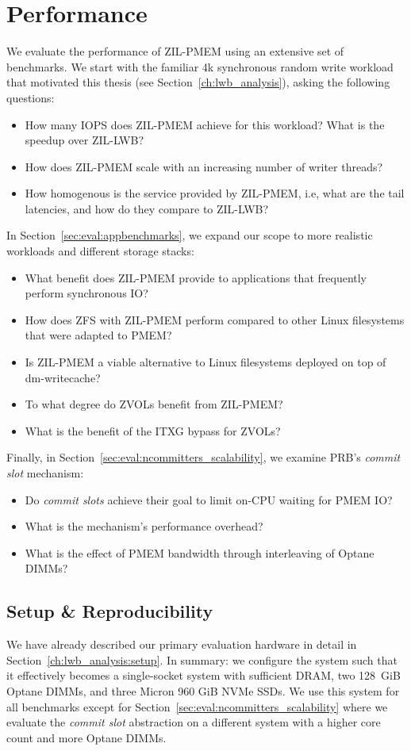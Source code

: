\documentclass[12pt,a4paper,twoside]{book}
\begin{document}
{\clearpage

\section{Performance}

We evaluate the performance of ZIL-PMEM using an extensive set of benchmarks.
We start with the familiar 4k synchronous random write workload that motivated this thesis (see Section~\ref{ch:lwb_analysis}), asking the following questions:
\begin{itemize}[noitemsep]
    \item How many IOPS does ZIL-PMEM achieve for this workload? What is the speedup over ZIL-LWB?
    \item How does ZIL-PMEM scale with an increasing number of writer threads?
    \item How homogenous is the service provided by ZIL-PMEM, i.e, what are the tail latencies, and how do they compare to ZIL-LWB?
\end{itemize}
In Section~\ref{sec:eval:appbenchmarks}, we expand our scope to more realistic workloads and different storage stacks:
\begin{itemize}[noitemsep]
    \item What benefit does ZIL-PMEM provide to applications that frequently perform synchronous IO?
    \item How does ZFS with ZIL-PMEM perform compared to other Linux filesystems that were adapted to PMEM?
    \item Is ZIL-PMEM a viable alternative to Linux filesystems deployed on top of dm-writecache?
    \item To what degree do ZVOLs benefit from ZIL-PMEM?
    \item What is the benefit of the ITXG bypass for ZVOLs?
\end{itemize}
Finally, in Section~\ref{sec:eval:ncommitters_scalability}, we examine PRB's \textit{commit slot} mechanism:
\begin{itemize}[noitemsep]
    \item Do \textit{commit slots} achieve their goal to limit on-CPU waiting for PMEM IO?
    \item What is the mechanism's performance overhead?
    \item What is the effect of PMEM bandwidth through interleaving of Optane DIMMs?
\end{itemize}

\subsection{Setup \& Reproducibility}
We have already described our primary evaluation hardware in detail in Section~\ref{ch:lwb_analysis:setup}.
In summary: we configure the system such that it effectively becomes a single-socket system with sufficient DRAM, two 128~GiB Optane DIMMs, and three Micron 960 GiB NVMe SSDs.
We use this system for all benchmarks except for Section~\ref{sec:eval:ncommitters_scalability} where we evaluate the \textit{commit slot} abstraction on a different system with a higher core count and more Optane DIMMs.

}
\end{document}
